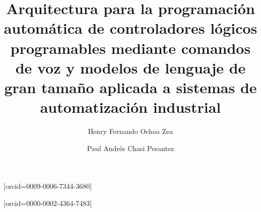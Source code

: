 \documentclass[a4paper,fleqn]{cas-dc}
\begin{document}
\let\WriteBookmarks\relax
{}
\def\floatpagepagefraction{1}
\def\textpagefraction{.001}

\setcounter{topnumber}{3}
\setcounter{dbltopnumber}{3}
\setcounter{totalnumber}{5}
\renewcommand{\topfraction}{.95}
\renewcommand{\dbltopfraction}{.95}
\title[mode=title]{Arquitectura para la programación automática de controladores lógicos programables mediante comandos de voz y modelos de lenguaje de gran tamaño aplicada a sistemas de automatización industrial}
\author[1]{Henry Fernando {Ochoa Zea}}[orcid=0009-0006-7344-3680]
\cormark[1]
\author[1]{Paul Andrés {Chasi Pesantez}}[orcid=0000-0002-4364-7483]
\end{document}
